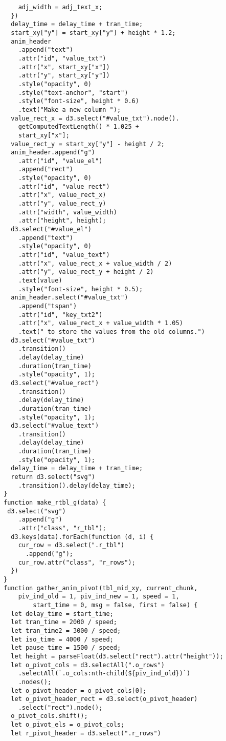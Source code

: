 \begin{lstlisting}
    adj_width = adj_text_x;
  })
  delay_time = delay_time + tran_time;
  start_xy["y"] = start_xy["y"] + height * 1.2;
  anim_header
    .append("text")
    .attr("id", "value_txt")
    .attr("x", start_xy["x"])
    .attr("y", start_xy["y"])
    .style("opacity", 0)
    .style("text-anchor", "start")
    .style("font-size", height * 0.6)
    .text("Make a new column ");
  value_rect_x = d3.select("#value_txt").node().
    getComputedTextLength() * 1.025 +
    start_xy["x"];
  value_rect_y = start_xy["y"] - height / 2;
  anim_header.append("g")
    .attr("id", "value_el")
    .append("rect")
    .style("opacity", 0)
    .attr("id", "value_rect")
    .attr("x", value_rect_x)
    .attr("y", value_rect_y)
    .attr("width", value_width)
    .attr("height", height);
  d3.select("#value_el")
    .append("text")
    .style("opacity", 0)
    .attr("id", "value_text")
    .attr("x", value_rect_x + value_width / 2)
    .attr("y", value_rect_y + height / 2)
    .text(value)
    .style("font-size", height * 0.5);
  anim_header.select("#value_txt")
    .append("tspan")
    .attr("id", "key_txt2")
    .attr("x", value_rect_x + value_width * 1.05)
    .text(" to store the values from the old columns.")
  d3.select("#value_txt")
    .transition()
    .delay(delay_time)
    .duration(tran_time)
    .style("opacity", 1);
  d3.select("#value_rect")
    .transition()
    .delay(delay_time)
    .duration(tran_time)
    .style("opacity", 1);
  d3.select("#value_text")
    .transition()
    .delay(delay_time)
    .duration(tran_time)
    .style("opacity", 1);
  delay_time = delay_time + tran_time;
  return d3.select("svg")
    .transition().delay(delay_time);
}
function make_rtbl_g(data) {
 d3.select("svg")
    .append("g")
    .attr("class", "r_tbl");
  d3.keys(data).forEach(function (d, i) {
    cur_row = d3.select(".r_tbl")
      .append("g");
    cur_row.attr("class", "r_rows");
  })
}
function gather_anim_pivot(tbl_mid_xy, current_chunk, 
    piv_ind_old = 1, piv_ind_new = 1, speed = 1, 
        start_time = 0, msg = false, first = false) {
  let delay_time = start_time;
  let tran_time = 2000 / speed;
  let tran_time2 = 3000 / speed;
  let iso_time = 4000 / speed;
  let pause_time = 1500 / speed;
  let height = parseFloat(d3.select("rect").attr("height"));
  let o_pivot_cols = d3.selectAll(".o_rows")
    .selectAll(`.o_cols:nth-child(${piv_ind_old})`)
    .nodes();
  let o_pivot_header = o_pivot_cols[0];
  let o_pivot_header_rect = d3.select(o_pivot_header)
    .select("rect").node();
  o_pivot_cols.shift();
  let o_pivot_els = o_pivot_cols;
  let r_pivot_header = d3.select(".r_rows")

\end{lstlisting}
